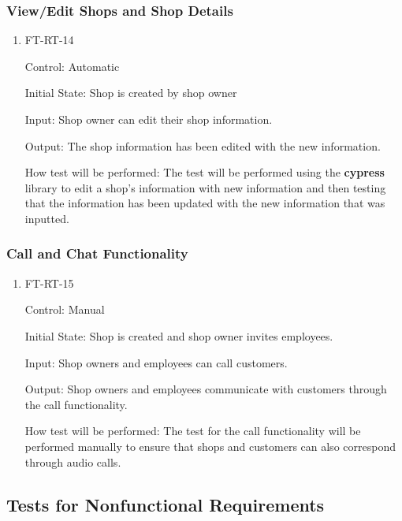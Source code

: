 \documentclass[12pt, titlepage]{article}
\begin{document}
\subsubsection{View/Edit Shops and Shop Details}

\begin{enumerate}

\item{FT-RT-14\\}

Control: Automatic
					
Initial State: Shop is created by shop owner
					
Input: Shop owner can edit their shop information.
					
Output: The shop information has been edited with the new information.

How test will be performed: The test will be performed using the \textbf{cypress} library to edit a shop's information with new information and then testing that the information has been updated with the new information that was inputted.

\end{enumerate}

\subsubsection{Call and Chat Functionality}

\begin{enumerate}
    \item{FT-RT-15\\}

Control: Manual

Initial State: Shop is created and shop owner invites employees.

Input: Shop owners and employees can call customers.

Output: Shop owners and employees communicate with customers through the call functionality.

How test will be performed: The test for the call functionality will be performed manually to ensure that shops and customers can also correspond through audio calls.
\end{enumerate}

\subsection{Tests for Nonfunctional Requirements}

\end{document}
